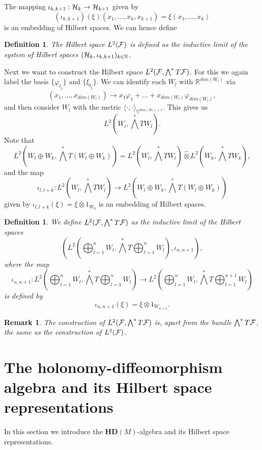\documentclass[letterpaper,12pt]{article}
\def\ch{{\cal H}}
\newtheorem{definition}[thm]{Definition}
\newtheorem{remark}{Remark}
\newcommand{\cF}{{\cal F}}
\newcommand{\R}{\mathbb{ R}}
\begin{document}
The mapping $ \iota_{k,k+1}:\ch_k\to \ch_{k+1}$ given by
$$ (\iota_{k,k+1})(\xi)(x_1,\ldots , x_k,x_{k+1})=\xi(x_1,\ldots , x_k)$$
is an embedding of Hilbert spaces. We can hence define
\begin{definition}
The Hilbert space $L^2(\cF)$ is defined as the inductive limit of the system of Hilbert spaces $(\ch_k,\iota_{k,k+1})_{k\in \mathbb{N}}$. 
\end{definition}

Next we want to construct the Hilbert space $L^2(\cF,\bigwedge^* T\cF )$. For this we again label the basis $\{\varphi_{l_j} \}$ and $\{ \xi_{l_j} \}$. We can identify each $W_l$ with $\R^{dim(W_l)}$ via
$$(x_1,\ldots ,x_{dim(W_l)})\to x_1\varphi_1+\ldots +x_{dim(W_l)} \varphi_{dim(W_l)},$$
and then consider $W_l$  with the metric $\langle \cdot ,\cdot \rangle_{\mathbb{S}^{dim(W_l)+1}}$. This gives us 
$$L^2(W_l,\bigwedge^* TW_l ).$$ Note that 
$$L^2(W_l\oplus W_k,\bigwedge^* T (W_l\oplus W_k) ) =L^2(W_l,\bigwedge^* TW_l ) \hat{\otimes} L^2(W_k,\bigwedge^* TW_k ),$$
and the map 
$$\iota_{l,l+k}:L^2(W_l,\bigwedge^* TW_l ) \to L^2(W_l\oplus W_k,\bigwedge^* T (W_l\oplus W_k) ) $$
given by $\iota_{l,l+k}(\xi)=\xi \otimes 1_{W_k}$ is an embedding of Hilbert spaces.

\begin{definition}
We define $L^2(\cF,\bigwedge^* T\cF )$ as the inductive limit of the Hilbert spaces 
$$(L^2 (\bigoplus_{l=1}^nW_l, \bigwedge^* T\bigoplus_{l=1}^n W_l), \iota_{n,n+1}) ,$$
where the map 
$$ \iota_{n,n+1}:L^2 (\bigoplus_{l=1}^nW_l, \bigwedge^* T\bigoplus_{l=1}^n W_l)\to L^2 (\bigoplus_{l=1}^{n}W_l, \bigwedge^* T\bigoplus_{l=1}^{n+1} W_l)  $$
is defined by 
 $$\iota_{n,n+1}(\xi)=\xi \otimes 1_{W_{n+1}}.$$
\end{definition}

\begin{remark} 
The construction of $L^2(\cF,\bigwedge^* T\cF )$ is, apart from the bundle $\bigwedge^* T\cF$, the same as the construction of  $L^2(\cF)$.
\end{remark}



\section{The holonomy-diffeomorphism algebra and its Hilbert space representations }

In this section we introduce the $\mathbf{HD}(M)$-algebra and its Hilbert space representations.\\
\end{document}
